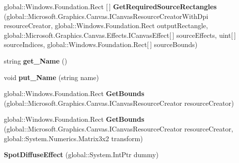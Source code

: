 \begin{DoxyCompactItemize}
global\+::\+Windows.\+Foundation.\+Rect \mbox{[}$\,$\mbox{]} {\bfseries Get\+Required\+Source\+Rectangles} (global\+::\+Microsoft.\+Graphics.\+Canvas.\+I\+Canvas\+Resource\+Creator\+With\+Dpi resource\+Creator, global\+::\+Windows.\+Foundation.\+Rect output\+Rectangle, global\+::\+Microsoft.\+Graphics.\+Canvas.\+Effects.\+I\+Canvas\+Effect\mbox{[}$\,$\mbox{]} source\+Effects, uint\mbox{[}$\,$\mbox{]} source\+Indices, global\+::\+Windows.\+Foundation.\+Rect\mbox{[}$\,$\mbox{]} source\+Bounds)
\item 
\mbox{\label{class_microsoft_1_1_graphics_1_1_canvas_1_1_effects_1_1_spot_diffuse_effect_a80017a8bc269e8b53be0237475f42fef}} 
string {\bfseries get\+\_\+\+Name} ()
\item 
\mbox{\label{class_microsoft_1_1_graphics_1_1_canvas_1_1_effects_1_1_spot_diffuse_effect_a84ad78cbbefa7d06bccedf8db81a069b}} 
void {\bfseries put\+\_\+\+Name} (string name)
\item 
\mbox{\label{class_microsoft_1_1_graphics_1_1_canvas_1_1_effects_1_1_spot_diffuse_effect_a69c0c17aa611778dd2e2b32293e37614}} 
global\+::\+Windows.\+Foundation.\+Rect {\bfseries Get\+Bounds} (global\+::\+Microsoft.\+Graphics.\+Canvas.\+I\+Canvas\+Resource\+Creator resource\+Creator)
\item 
\mbox{\label{class_microsoft_1_1_graphics_1_1_canvas_1_1_effects_1_1_spot_diffuse_effect_ac221cecc5ef487645395a4d4e165ea3d}} 
global\+::\+Windows.\+Foundation.\+Rect {\bfseries Get\+Bounds} (global\+::\+Microsoft.\+Graphics.\+Canvas.\+I\+Canvas\+Resource\+Creator resource\+Creator, global\+::\+System.\+Numerics.\+Matrix3x2 transform)
\item 
\mbox{\label{class_microsoft_1_1_graphics_1_1_canvas_1_1_effects_1_1_spot_diffuse_effect_a1793ac01d2b7fcfb4c8585ffa6e4fe3e}} 
{\bfseries Spot\+Diffuse\+Effect} (global\+::\+System.\+Int\+Ptr dummy)
\item 
\mbox{\label{class_microsoft_1_1_graphics_1_1_canvas_1_1_effects_1_1_spot_diffuse_effect_aafe044ef81617030138a79156a50e0df}} 

\end{DoxyCompactItemize}
